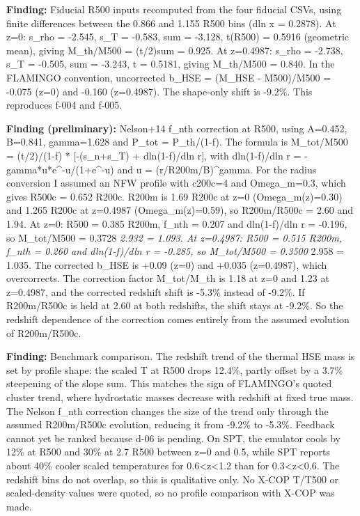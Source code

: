 \documentclass[11pt,a4paper]{article}
\begin{document}
\textbf{Finding:} Fiducial R500 inputs recomputed from the four fiducial CSVs, using finite differences between the 0.866 and 1.155 R500 bins (dln x = 0.2878). At z=0: s\_rho = -2.545, s\_T = -0.583, sum = -3.128, t(R500) = 0.5916 (geometric mean), giving M\_th/M500 = (t/2)\textbar{}sum\textbar{} = 0.925. At z=0.4987: s\_rho = -2.738, s\_T = -0.505, sum = -3.243, t = 0.5181, giving M\_th/M500 = 0.840. In the FLAMINGO convention, uncorrected b\_HSE = (M\_HSE - M500)/M500 = -0.075 (z=0) and -0.160 (z=0.4987). The shape-only shift is -9.2\%. This reproduces f-004 and f-005.

\textbf{Finding (preliminary):} Nelson+14 f\_nth correction at R500, using A=0.452, B=0.841, gamma=1.628 and P\_tot = P\_th/(1-f). The formula is M\_tot/M500 = (t/2)/(1-f) * [-(s\_n+s\_T) + dln(1-f)/dln r], with dln(1-f)/dln r = -gamma*u*e\textasciicircum{}-u/(1+e\textasciicircum{}-u) and u = (r/R200m/B)\textasciicircum{}gamma. For the radius conversion I assumed an NFW profile with c200c=4 and Omega\_m=0.3, which gives R500c = 0.652 R200c. R200m is 1.69 R200c at z=0 (Omega\_m(z)=0.30) and 1.265 R200c at z=0.4987 (Omega\_m(z)=0.59), so R200m/R500c = 2.60 and 1.94. At z=0: R500 = 0.385 R200m, f\_nth = 0.207 and dln(1-f)/dln r = -0.196, so M\_tot/M500 = 0.3728 \textit{ 2.932 = 1.093. At z=0.4987: R500 = 0.515 R200m, f\_nth = 0.260 and dln(1-f)/dln r = -0.285, so M\_tot/M500 = 0.3500 } 2.958 = 1.035. The corrected b\_HSE is +0.09 (z=0) and +0.035 (z=0.4987), which overcorrects. The correction factor M\_tot/M\_th is 1.18 at z=0 and 1.23 at z=0.4987, and the corrected redshift shift is -5.3\% instead of -9.2\%. If R200m/R500c is held at 2.60 at both redshifts, the shift stays at -9.2\%. So the redshift dependence of the correction comes entirely from the assumed evolution of R200m/R500c.

\textbf{Finding:} Benchmark comparison. The redshift trend of the thermal HSE mass is set by profile shape: the scaled T at R500 drops 12.4\%, partly offset by a 3.7\% steepening of the slope sum. This matches the sign of FLAMINGO's quoted cluster trend, where hydrostatic masses decrease with redshift at fixed true mass. The Nelson f\_nth correction changes the size of the trend only through the assumed R200m/R500c evolution, reducing it from -9.2\% to -5.3\%. Feedback cannot yet be ranked because d-06 is pending. On SPT, the emulator cools by 12\% at R500 and 30\% at 2.7 R500 between z=0 and 0.5, while SPT reports about 40\% cooler scaled temperatures for 0.6\textless{}z\textless{}1.2 than for 0.3\textless{}z\textless{}0.6. The redshift bins do not overlap, so this is qualitative only. No X-COP T/T500 or scaled-density values were quoted, so no profile comparison with X-COP was made.
\end{document}
